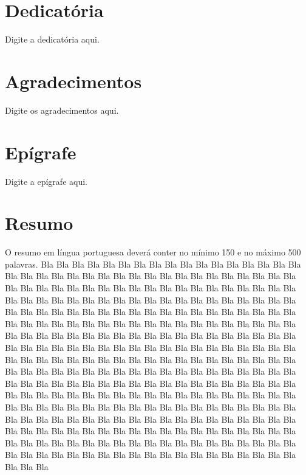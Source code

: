 \documentclass[a4paper,reqno,12pt,oneside]{book}
\begin{document}
\renewcommand{\bibname}{Referências}





%

\chapter*{Dedicatória}
\thispagestyle{empty}

Digite a dedicatória aqui.


\chapter*{Agradecimentos}
\thispagestyle{empty}

Digite os agradecimentos aqui.


\chapter*{Epígrafe}
\thispagestyle{empty}

Digite a epígrafe aqui.


\chapter*{Resumo}
\thispagestyle{empty}
\noindent
O resumo em língua portuguesa deverá conter no mínimo 150 e no máximo 500 palavras.
Bla Bla Bla Bla Bla Bla Bla Bla Bla Bla Bla Bla Bla Bla Bla Bla Bla Bla 
Bla Bla Bla Bla Bla Bla Bla Bla Bla Bla Bla Bla Bla Bla Bla Bla Bla Bla 
Bla Bla Bla Bla Bla Bla Bla Bla Bla Bla Bla Bla Bla Bla Bla Bla Bla Bla 
Bla Bla Bla Bla Bla Bla Bla Bla Bla Bla Bla Bla Bla Bla Bla Bla Bla Bla 
Bla Bla Bla Bla Bla Bla Bla Bla Bla Bla Bla Bla Bla Bla Bla Bla Bla Bla 
Bla Bla Bla Bla Bla Bla Bla Bla Bla Bla Bla Bla Bla Bla Bla Bla Bla Bla 
Bla Bla Bla Bla Bla Bla Bla Bla Bla Bla Bla Bla Bla Bla Bla Bla Bla Bla 
Bla Bla Bla Bla Bla Bla Bla Bla Bla Bla Bla Bla Bla Bla Bla Bla Bla Bla 
Bla Bla Bla Bla Bla Bla Bla Bla Bla Bla Bla Bla Bla Bla Bla Bla Bla Bla 
Bla Bla Bla Bla Bla Bla Bla Bla Bla Bla Bla Bla Bla Bla Bla Bla Bla Bla 
Bla Bla Bla Bla Bla Bla Bla Bla Bla Bla Bla Bla Bla Bla Bla Bla Bla Bla 
Bla Bla Bla Bla Bla Bla Bla Bla Bla Bla Bla Bla Bla Bla Bla Bla Bla Bla 
Bla Bla Bla Bla Bla Bla Bla Bla Bla Bla Bla Bla Bla Bla Bla Bla Bla Bla 
Bla Bla Bla Bla Bla Bla Bla Bla Bla Bla Bla Bla Bla Bla Bla Bla Bla Bla 
Bla Bla Bla Bla Bla Bla Bla Bla Bla Bla Bla Bla Bla Bla Bla Bla Bla Bla 
Bla Bla Bla Bla Bla Bla Bla Bla Bla Bla Bla Bla Bla Bla Bla Bla Bla Bla 
Bla Bla Bla Bla Bla Bla Bla Bla Bla Bla Bla Bla Bla Bla Bla Bla Bla Bla 
Bla Bla Bla Bla Bla Bla Bla Bla Bla Bla Bla Bla Bla Bla Bla Bla Bla Bla 
\end{document}

